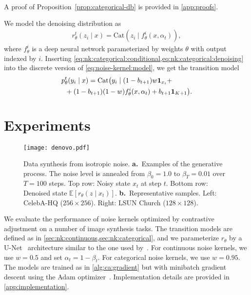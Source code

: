 \documentclass[10pt,twocolumn,letterpaper]{article}
\begin{document}
A proof of Proposition~\ref{prop:categorical-db} is provided in \cref{app:proofs}.

We model the denoising distribution as
\begin{align}
  \label{eq:nk:categorical:denoising}
  r^{t}_{\theta}(z_{i} \mid x) = \text{Cat}\left(z_{i} \mid f^{i}_{\theta}(x, \alpha_{t})\right)
  ,
\end{align}
where $f^{i}_{\theta}$ is a deep neural network parameterized by weights $\theta$ with output indexed by $i$.
Inserting \cref{eq:nk:categorical:conditional,eq:nk:categorical:denoising} into the discrete version of \cref{eq:noise-kernel:model}, we get the transition model
\begin{align}
  p^{t}_{\theta}(y_{i} \mid x)
  & =
    \text{Cat}\big(
    y_{i} \mid
    (1 - b_{t+1}) w \mathbf{1}_{x_{i}} +
    \nonumber \\
  & \hspace{-1.2cm}
    + (1 - b_{t+1}) (1 - w) f^{i}_{\theta}(x, \alpha_{t}) + b_{t+1} \mathbf{1}_{K+1}
    \big)
    .
\end{align}


\section{Experiments}\label{sec:experiments}

\begin{figure*}[t]
  \centering
  \texttt{[image: denovo.pdf]}\caption{Data synthesis from isotropic noise.
    \textbf{a.}~Examples of the generative process.
    The noise level is annealed from $\beta_{0}=1.0$ to $\beta_{T}=0.01$ over $T=100$ steps.
    Top row: Noisy state $x_{t}$ at step $t$.
    Bottom row: Denoised state $\mathbb{E}[r_{\theta}(z \mid x_{t})]$.
    \textbf{b.}~Representative samples.
    Left: CelebA-HQ ($256 \times 256$). Right: LSUN Church ($128 \times 128$).
  }\label{fig:imagesynthesis}
\end{figure*}

We evaluate the performance of noise kernels optimized by contrastive adjustment on a number of image synthesis tasks.
The transition models are defined as in \cref{sec:nk:continuous,sec:nk:categorical}, and we parameterize $r_{\theta}$ by a U-Net~\cite{ronneberger2015u} architecture similar to the one used by~\textcite{hoogeboom2021argmax}.
For continuous noise kernels, we use $w=0.5$ and set $\alpha_{t} = 1 - \beta_{t}$.
For categorical noise kernels, we use $w=0.95$.
The models are trained as in \cref{alg:ca:gradient} but with minibatch gradient descent using the Adam optimizer~\cite{kingma2014adam}.
Implementation details are provided in \cref{app:implementation}.
\end{document}

